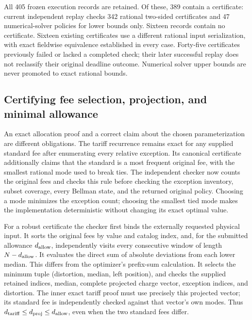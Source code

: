 All 405 frozen execution records are retained. Of these, 389 contain a certificate: current independent replay checks 342 rational two-sided certificates and 47 numerical-solver policies for lower bounds only. Sixteen records contain no certificate. Sixteen existing certificates use a different rational input serialization, with exact fieldwise equivalence established in every case. Forty-five certificates previously failed or lacked a completed check; their later successful replay does not reclassify their original deadline outcome. Numerical solver upper bounds are never promoted to exact rational bounds.

\subsection{Certifying fee selection, projection, and minimal allowance}\label{sec:semantic64}
An exact allocation proof and a correct claim about the chosen parameterization are different obligations. The tariff recurrence remains exact for any supplied standard fee after enumerating every relative exception. Its canonical certificate additionally claims that the standard is a most frequent original fee, with the smallest rational mode used to break ties. The independent checker now counts the original fees and checks this rule before checking the exception inventory, subset coverage, every Bellman state, and the returned original policy. Choosing a mode minimizes the exception count; choosing the smallest tied mode makes the implementation deterministic without changing its exact optimal value.

For a robust certificate the checker first binds the externally requested physical input. It sorts the original fees by value and catalog index, and, for the submitted allowance $d_{\rm allow}$, independently visits every consecutive window of length $N-d_{\rm allow}$. It evaluates the direct sum of absolute deviations from each lower median. This differs from the optimizer's prefix-sum calculation. It selects the minimum tuple (distortion, median, left position), and checks the supplied retained indices, median, complete projected charge vector, exception indices, and distortion. The inner exact tariff proof must use precisely this projected vector; its standard fee is independently checked against that vector's own modes. Thus $d_{\rm tariff}\leq d_{\rm proj}\leq d_{\rm allow}$, even when the two standard fees differ.


